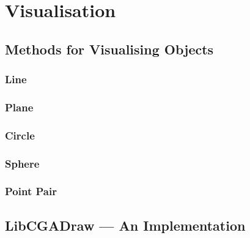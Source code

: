 \chapter{Visualisation}

\section{Methods for Visualising Objects}
\subsection{Line}
\subsection{Plane}
\subsection{Circle}
\subsection{Sphere}
\subsection{Point Pair}

\section{LibCGADraw --- An Implementation}
